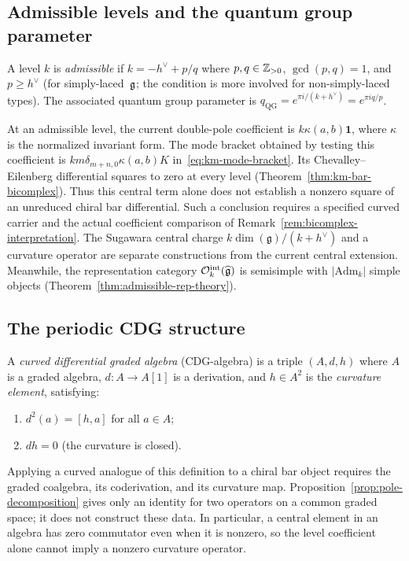 \subsection{Admissible levels and the quantum group parameter}

\begin{definition}
\label{def:admissible-level-dl}
A level $k$ is \emph{admissible} if
$k = -h^\vee + p/q$ where $p, q \in \mathbb{Z}_{> 0}$, $\gcd(p, q) = 1$,
and $p \geq h^\vee$ (for simply-laced~$\mathfrak{g}$; the condition is more
involved for non-simply-laced types).  The associated quantum group
parameter is $q_{\mathrm{QG}} = e^{\pi i/(k + h^\vee)} = e^{\pi i q/p}$.
\end{definition}

At an admissible level, the current double-pole coefficient is
$k\kappa(a,b)\mathbf1$, where $\kappa$ is the normalized invariant form.
The mode bracket obtained by testing this coefficient is
$km\delta_{m+n,0}\kappa(a,b)K$ in~\eqref{eq:km-mode-bracket}.
Its Chevalley--Eilenberg differential squares to zero at every level
(Theorem~\ref{thm:km-bar-bicomplex}).  Thus this central term alone does not
establish a nonzero square of an unreduced chiral bar differential.
Such a conclusion requires a specified curved carrier and the actual
coefficient comparison of Remark~\ref{rem:bicomplex-interpretation}.
The Sugawara central charge $k\dim(\mathfrak g)/(k+h^\vee)$ and a curvature
operator are separate constructions from the current central extension.
Meanwhile, the representation category $\mathcal{O}_k^{\mathrm{int}}(\widehat{\mathfrak{g}})$
is semisimple with $|\mathrm{Adm}_k|$ simple objects
(Theorem~\ref{thm:admissible-rep-theory}).

\subsection{The periodic CDG structure}

\begin{definition}
\label{def:cdg-algebra}
A \emph{curved differential graded algebra} (CDG-algebra) is a
triple $(A, d, h)$ where $A$ is a graded algebra,
$d\colon A \to A[1]$ is a derivation, and $h \in A^2$ is the
\emph{curvature element}, satisfying:
\begin{enumerate}[label=\textup{(\roman*)}]
\item $d^2(a) = [h, a]$ for all $a \in A$;
\item $dh = 0$ (the curvature is closed).
\end{enumerate}
Applying a curved analogue of this definition to a chiral bar object
requires the graded coalgebra, its coderivation, and its curvature map.
Proposition~\ref{prop:pole-decomposition} gives only an identity for two
operators on a common graded space; it does not construct these data.
In particular, a central element in an algebra has zero commutator even
when it is nonzero, so the level coefficient alone cannot imply a
nonzero curvature operator.
\end{definition}

